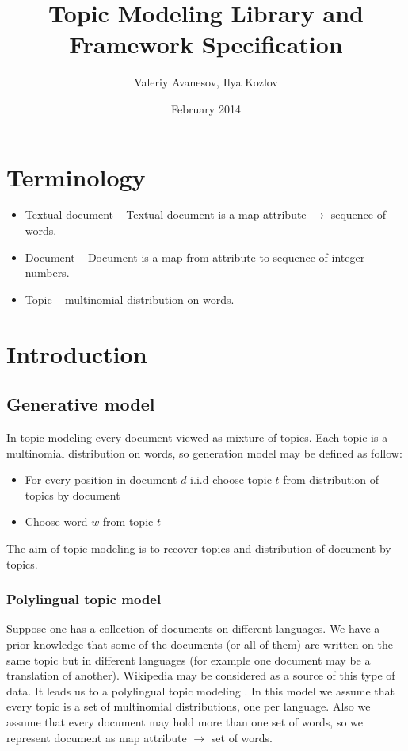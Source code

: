 \documentclass{article}
\title{Topic Modeling Library and Framework Specification}
\author{Valeriy Avanesov, Ilya Kozlov}
\date{February 2014}
\begin{document}
\maketitle

\section{Terminology}
    \begin{itemize}
        \item Textual document \--- Textual document is a map attribute $\to$ sequence of words. 
        \item Document \--- Document is a map from attribute to sequence of integer numbers.
        \item Topic \--- multinomial distribution on words. 
    \end{itemize}

\section{Introduction}
    \subsection{Generative model}
        In topic modeling every document viewed as mixture of topics. Each topic is a multinomial distribution on words, 
        so generation model may be defined as follow:
        \begin{itemize} \label{generation}
            \item For every position in document $d$ i.i.d choose topic $t$ from distribution of topics by document
            \item Choose word $w$ from topic $t$
        \end{itemize}
        The aim of topic modeling is to recover topics and distribution of document by topics. 
        \subsubsection{Polylingual topic model}
	    Suppose one has a collection of documents on different languages. We have a prior knowledge that some of the
	    documents (or all of them) are written on the same topic but in different languages (for example one document may be a translation of another).
	    Wikipedia may be considered as a source of this type of data. It leads us to a polylingual topic modeling \cite{polylingual}.
	    In this model we assume that every topic is a set of multinomial distributions, one per language. Also we assume that
	    every document may hold more than one set of words, so we represent document as map attribute $\to$ set of words.  
\end{document}
